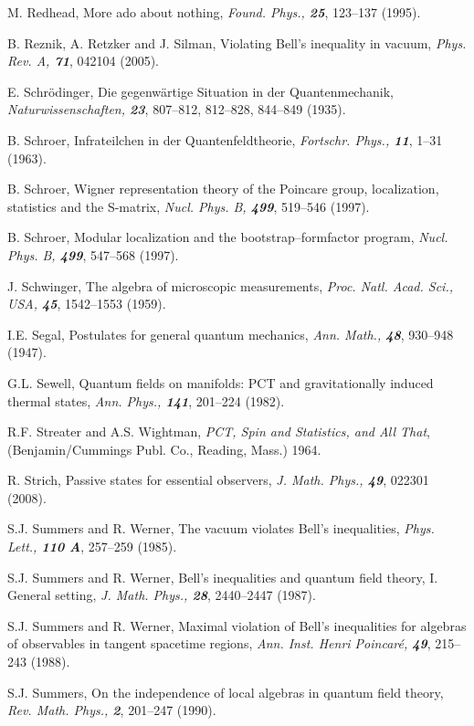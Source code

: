 \documentclass[12pt]{article}
\begin{document}
\begin{thebibliography}{Bor}
M. Redhead, More ado about nothing, {\sl Found. Phys., \bf 25}, 123--137 
(1995).

B. Reznik, A. Retzker and J. Silman, Violating Bell's inequality in
vacuum, {\sl Phys. Rev. A, \bf 71}, 042104 (2005).

E. Schr\"odinger, Die gegenw\"artige Situation in der Quantenmechanik,
{\sl  Naturwissenschaften, \bf 23}, 807--812, 812--828, 844--849 (1935).

B. Schroer, Infrateilchen in der Quantenfeldtheorie, {\sl Fortschr.
Phys., \bf 11}, 1--31 (1963).

B. Schroer, Wigner representation theory of the Poincare group, 
localization, statistics and the S-matrix, {\sl  Nucl. Phys. B, \bf 499},
519--546 (1997). 

B. Schroer, Modular localization and the bootstrap--formfactor
program, {\sl Nucl. Phys. B, \bf 499}, 547--568 (1997).

J. Schwinger, The algebra of microscopic measurements, {\sl Proc. Natl.
Acad. Sci., USA, \bf 45}, 1542--1553 (1959).

I.E. Segal, Postulates for general quantum mechanics, {\sl Ann. Math.,
\bf 48}, 930--948 (1947).

G.L. Sewell, Quantum fields on manifolds: PCT and gravitationally
induced thermal states, {\sl Ann. Phys., \bf 141}, 201--224 (1982).

R.F. Streater and A.S. Wightman, {\it PCT, Spin and Statistics, and
All That}, (Benjamin/Cummings Publ. Co., Reading, Mass.) 1964.

R. Strich, Passive states for essential observers, {\sl J. Math. Phys.,
\bf 49}, 022301 (2008).

S.J. Summers and R. Werner, The vacuum violates Bell's inequalities,
{\sl Phys. Lett., \bf 110 A}, 257--259 (1985).

S.J. Summers and R. Werner, Bell's inequalities and quantum field
theory, I. General setting, {\sl J. Math. Phys., \bf 28}, 2440--2447
(1987).

S.J. Summers and R. Werner, Maximal violation of Bell's inequalities
for algebras of observables in tangent spacetime regions, {\sl Ann. Inst.
Henri Poincar\'e, \bf 49}, 215--243 (1988).

S.J. Summers, On the independence of local algebras in quantum field theory,
{\sl Rev. Math. Phys., \bf 2}, 201--247 (1990).


\end{thebibliography}
\end{document}
